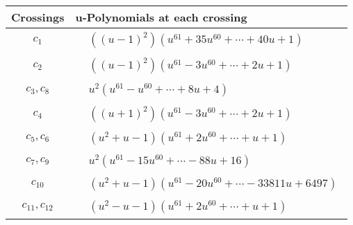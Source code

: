 \documentclass[1p]{elsarticle_modified}
\theoremstyle{definition}
\begin{document}
\begin{tabular}{m{50pt}|m{274pt}}
Crossings & \hspace{64pt}u-Polynomials at each crossing \\
\hline $$\begin{aligned}c_{1}\end{aligned}$$&$\begin{aligned}
&((u-1)^2)(u^{61}+35 u^{60}+\cdots+40 u+1)
\end{aligned}$\\
\hline $$\begin{aligned}c_{2}\end{aligned}$$&$\begin{aligned}
&((u-1)^2)(u^{61}-3 u^{60}+\cdots+2 u+1)
\end{aligned}$\\
\hline $$\begin{aligned}c_{3},c_{8}\end{aligned}$$&$\begin{aligned}
&u^2(u^{61}- u^{60}+\cdots+8 u+4)
\end{aligned}$\\
\hline $$\begin{aligned}c_{4}\end{aligned}$$&$\begin{aligned}
&((u+1)^2)(u^{61}-3 u^{60}+\cdots+2 u+1)
\end{aligned}$\\
\hline $$\begin{aligned}c_{5},c_{6}\end{aligned}$$&$\begin{aligned}
&(u^2+u-1)(u^{61}+2 u^{60}+\cdots+u+1)
\end{aligned}$\\
\hline $$\begin{aligned}c_{7},c_{9}\end{aligned}$$&$\begin{aligned}
&u^2(u^{61}-15 u^{60}+\cdots-88 u+16)
\end{aligned}$\\
\hline $$\begin{aligned}c_{10}\end{aligned}$$&$\begin{aligned}
&(u^2+u-1)(u^{61}-20 u^{60}+\cdots-33811 u+6497)
\end{aligned}$\\
\hline $$\begin{aligned}c_{11},c_{12}\end{aligned}$$&$\begin{aligned}
&(u^2- u-1)(u^{61}+2 u^{60}+\cdots+u+1)
\end{aligned}$\\
\hline
\end{tabular}\newpage\renewcommand{\arraystretch}{1}
\end{document}
